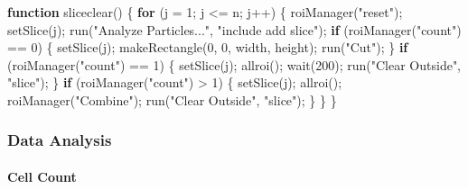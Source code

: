\documentclass[10pt, b5paper, singlespacinge, twoside]{reedthesis} %
\newenvironment{Shaded}{}{}
\newcommand{\AttributeTok}[1]{#1}
\newcommand{\ControlFlowTok}[1]{\textbf{#1}}
\newcommand{\DecValTok}[1]{#1}
\newcommand{\FunctionTok}[1]{#1}
\newcommand{\NormalTok}[1]{#1}
\newcommand{\SpecialCharTok}[1]{#1}
\newcommand{\StringTok}[1]{#1}
\theoremstyle{definition}
\theoremstyle{definition}
\theoremstyle{definition}
\theoremstyle{remark}
\begin{document}
\scriptsize
\begin{Shaded}
\begin{Highlighting}[numbers=left,,]
\ControlFlowTok{function} \FunctionTok{sliceclear}\NormalTok{() \{}
  \ControlFlowTok{for}\NormalTok{ (}\AttributeTok{j =} \DecValTok{1}\NormalTok{; j }\SpecialCharTok{\textless{}=}\NormalTok{ n; j}\SpecialCharTok{++}\NormalTok{) \{}
    \FunctionTok{roiManager}\NormalTok{(}\StringTok{"reset"}\NormalTok{);}
    \FunctionTok{setSlice}\NormalTok{(j);}
    \FunctionTok{run}\NormalTok{(}\StringTok{"Analyze Particles..."}\NormalTok{, }\StringTok{"include add slice"}\NormalTok{);}
    \ControlFlowTok{if}\NormalTok{ (}\FunctionTok{roiManager}\NormalTok{(}\StringTok{"count"}\NormalTok{) }\SpecialCharTok{==} \DecValTok{0}\NormalTok{) \{}
        \FunctionTok{setSlice}\NormalTok{(j);}
        \FunctionTok{makeRectangle}\NormalTok{(}\DecValTok{0}\NormalTok{, }\DecValTok{0}\NormalTok{, width, height);}
        \FunctionTok{run}\NormalTok{(}\StringTok{"Cut"}\NormalTok{);}
\NormalTok{    \}}
    \ControlFlowTok{if}\NormalTok{ (}\FunctionTok{roiManager}\NormalTok{(}\StringTok{"count"}\NormalTok{) }\SpecialCharTok{==} \DecValTok{1}\NormalTok{) \{}
        \FunctionTok{setSlice}\NormalTok{(j);}
        \FunctionTok{allroi}\NormalTok{();}
        \FunctionTok{wait}\NormalTok{(}\DecValTok{200}\NormalTok{);}
        \FunctionTok{run}\NormalTok{(}\StringTok{"Clear Outside"}\NormalTok{, }\StringTok{"slice"}\NormalTok{);}
\NormalTok{    \}}
    \ControlFlowTok{if}\NormalTok{ (}\FunctionTok{roiManager}\NormalTok{(}\StringTok{"count"}\NormalTok{) }\SpecialCharTok{\textgreater{}} \DecValTok{1}\NormalTok{) \{}
        \FunctionTok{setSlice}\NormalTok{(j);}
        \FunctionTok{allroi}\NormalTok{();}
        \FunctionTok{roiManager}\NormalTok{(}\StringTok{"Combine"}\NormalTok{);}
        \FunctionTok{run}\NormalTok{(}\StringTok{"Clear Outside"}\NormalTok{, }\StringTok{"slice"}\NormalTok{);}
\NormalTok{    \}}
\NormalTok{  \}}
\NormalTok{\}}
\end{Highlighting}
\end{Shaded}
\normalsize

\hypertarget{data-analysis-1}{%
\subsubsection{Data Analysis}\label{data-analysis-1}}

\hypertarget{cell-count}{%
\paragraph{Cell Count}\label{cell-count}}
\end{document}
